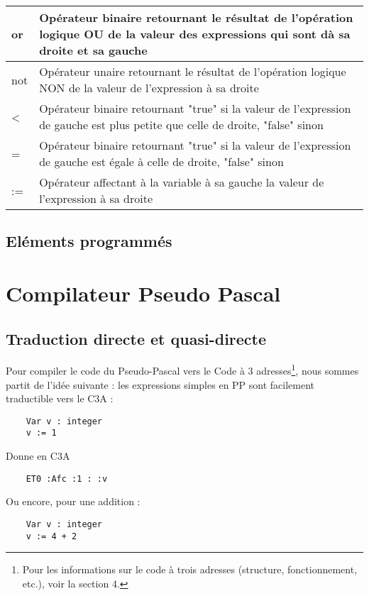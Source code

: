 \documentclass{article}
\begin{document}
\begin{tabular}{|p{2cm}|p{11cm}|}
  or & Opérateur binaire retournant le résultat de l'opération logique OU de la valeur des expressions qui sont dà sa droite et sa gauche\\ \hline
  not & Opérateur unaire retournant le résultat de l'opération logique NON de la valeur de l'expression à sa droite \\ \hline
  < & Opérateur binaire retournant "true" si la valeur de l'expression de gauche est plus petite que celle de droite, "false" sinon\\ \hline
  = & Opérateur binaire retournant "true" si la valeur de l'expression de gauche est égale à celle de droite, "false" sinon\\ \hline
  := & Opérateur affectant à la variable à sa gauche la valeur de l'expression à sa droite \\ \hline
\end{tabular}



\subsection{Eléments programmés}



\newpage
\section{Compilateur Pseudo Pascal}

\subsection{Traduction directe et quasi-directe}
Pour compiler le code du Pseudo-Pascal vers le Code à 3 adresses\footnote{Pour les informations sur le code à trois adresses (structure, fonctionnement, etc.), voir la section 4.}, nous sommes partit de l'idée suivante : les expressions simples en PP sont facilement traductible vers le C3A :

\begin{lstlisting}
    Var v : integer
    v := 1
\end{lstlisting}

Donne en C3A

\begin{lstlisting}
    ET0 :Afc :1 : :v
\end{lstlisting}

Ou encore, pour une addition :

\begin{lstlisting}
    Var v : integer
    v := 4 + 2
\end{lstlisting}
\end{document}
